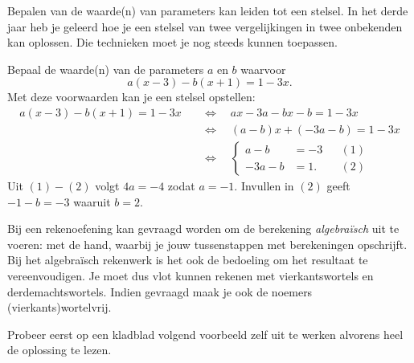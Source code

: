 \documentclass{ximera}
\begin{document}
Bepalen van de waarde(n) van parameters kan leiden tot een stelsel. 
In het derde jaar heb je geleerd hoe je een stelsel van twee vergelijkingen in twee onbekenden kan oplossen. Die technieken moet je nog steeds kunnen toepassen. 



\begin{example} 
Bepaal de waarde(n) van de parameters \(a\) en \(b\) waarvoor
\[
a(x-3) - b(x+1) = 1-3x.
\]
Met deze voorwaarden kan je een stelsel opstellen:
\begin{align*}
a(x-3) - b(x+1) = 1-3x \quad 
& \Leftrightarrow \quad ax-3a-bx-b=1-3x \\
& \Leftrightarrow \quad (a-b)x +(-3a-b) = 1-3x \\
& \Leftrightarrow \quad
\left\{
\begin{aligned}
a - b & = -3 && (1)\\
-3a - b & = 1. && (2)
\end{aligned}
\right.
\end{align*}
Uit \((1)-(2)\) volgt \(4a = -4\) zodat \(a = -1\). Invullen in \((2)\) geeft \(-1-b =  -3\) waaruit \(b = 2\). 
\end{example} 



Bij een rekenoefening kan gevraagd worden om de berekening \textit{ algebraïsch} uit te voeren: met de hand, waarbij je jouw tussenstappen met berekeningen opschrijft. Bij het algebraïsch rekenwerk is het ook de bedoeling om het resultaat te vereenvoudigen. Je moet dus vlot kunnen rekenen met vierkantswortels en derdemachtswortels. Indien gevraagd maak je ook de noemers (vierkants)wortelvrij. 


Probeer eerst op een kladblad volgend voorbeeld zelf uit te werken alvorens heel de oplossing te lezen. 
\end{document}
